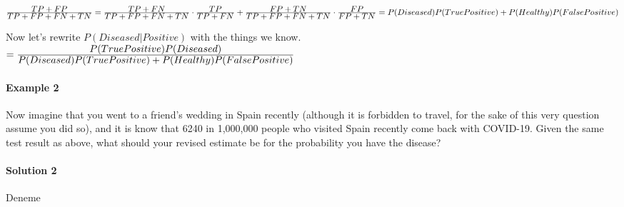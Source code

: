 \documentclass[12pt]{article}
\begin{document}
\begin{math}
 \ddfrac{TP + FP}{TP + FP + FN + TN} = \\\\
 \ddfrac{TP + FN}{TP + FP + FN + TN}\cdot\ddfrac{TP}{TP + FN} +
 \ddfrac{FP + TN}{TP + FP + FN + TN}\cdot\ddfrac{FP}{FP + TN} \\\newline
= P(Diseased)P(True Positive) + P(Healthy)P(False Positive)
\end{math}

\pagebreak
Now let's rewrite $P(Diseased|Positive)$ with the things we know.\\

    $ =\frac{\displaystyle P(True Positive)P(Diseased)}{\displaystyle P(Diseased)P(True Positive) + P(Healthy)P(False Positive)}$

\paragraph{Example 2}
Now imagine that you went to a friend’s wedding in Spain recently (although it is forbidden to travel, for the sake of this very question assume you did so), and it is know that 6240 in 1,000,000 people who visited Spain recently come back with COVID-19. Given the same test result as above, what should your revised estimate be for the probability you have the disease?

\paragraph{Solution 2}
Deneme
\end{document}
